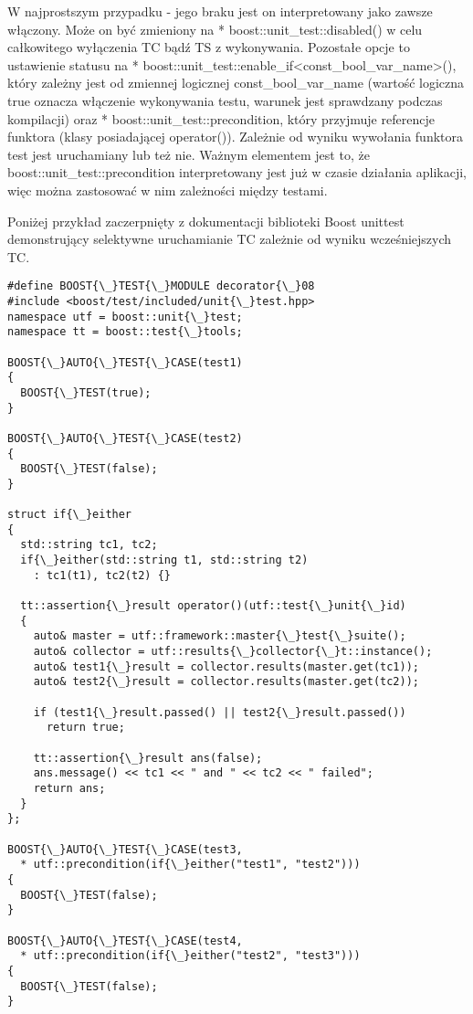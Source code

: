 \documentclass[12pt,a4paper,notitlepage]{report}
\begin{document}
W najprostszym przypadku - jego braku jest on interpretowany jako zawsze włączony. Może on być zmieniony na * boost::unit{\_}test::disabled() w celu całkowitego wyłączenia TC bądź TS z wykonywania. 
Pozostałe opcje to ustawienie statusu na * boost::unit{\_}test::enable{\_}if<const{\_}bool{\_}var{\_}name>(), który zależny jest od zmiennej logicznej const{\_}bool{\_}var{\_}name (wartość logiczna true oznacza włączenie wykonywania testu, warunek jest sprawdzany podczas kompilacji) oraz * boost::unit{\_}test::precondition, który przyjmuje referencje funktora (klasy posiadającej operator()). Zależnie od wyniku wywołania funktora test jest uruchamiany lub też nie. Ważnym elementem jest to, że boost::unit{\_}test::precondition interpretowany jest już w czasie działania aplikacji, więc można zastosować w nim zależności między testami.

Poniżej przykład zaczerpnięty z dokumentacji biblioteki Boost unittest demonstrujący selektywne uruchamianie TC zależnie od wyniku wcześniejszych TC.

		\begin{lstlisting}[label=some-code,caption=Listing programu rysującego model jajka w 3D]
#define BOOST{\_}TEST{\_}MODULE decorator{\_}08
#include <boost/test/included/unit{\_}test.hpp>
namespace utf = boost::unit{\_}test;
namespace tt = boost::test{\_}tools;

BOOST{\_}AUTO{\_}TEST{\_}CASE(test1)
{
  BOOST{\_}TEST(true);
}

BOOST{\_}AUTO{\_}TEST{\_}CASE(test2)
{
  BOOST{\_}TEST(false);
}

struct if{\_}either
{
  std::string tc1, tc2;
  if{\_}either(std::string t1, std::string t2)
    : tc1(t1), tc2(t2) {}

  tt::assertion{\_}result operator()(utf::test{\_}unit{\_}id)
  {
    auto& master = utf::framework::master{\_}test{\_}suite();
    auto& collector = utf::results{\_}collector{\_}t::instance();
    auto& test1{\_}result = collector.results(master.get(tc1));
    auto& test2{\_}result = collector.results(master.get(tc2));

    if (test1{\_}result.passed() || test2{\_}result.passed())
      return true;

    tt::assertion{\_}result ans(false);
    ans.message() << tc1 << " and " << tc2 << " failed";
    return ans;
  }
};

BOOST{\_}AUTO{\_}TEST{\_}CASE(test3,
  * utf::precondition(if{\_}either("test1", "test2")))
{
  BOOST{\_}TEST(false);
}

BOOST{\_}AUTO{\_}TEST{\_}CASE(test4,
  * utf::precondition(if{\_}either("test2", "test3")))
{
  BOOST{\_}TEST(false);
}
		\end{lstlisting}
\end{document}
